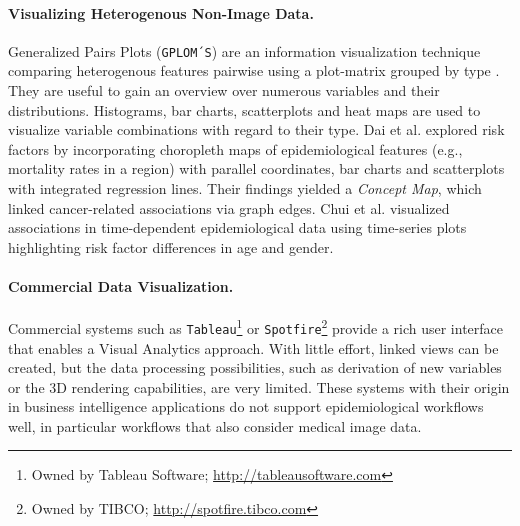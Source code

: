 \documentclass[journal]{style/vgtc} 			          %
\begin{document}
\paragraph{Visualizing Heterogenous Non-Image Data.}
Generalized Pairs Plots (\texttt{GPLOM´S}) are an information visualization technique comparing heterogenous features pairwise using a plot-matrix grouped by type \cite{GPLOMS, Francois2013}.
%
They are useful to gain an overview over numerous variables and their distributions.
%
Histograms, bar charts, scatterplots and heat maps are used to visualize variable combinations with regard to their type.
%
%
%
%
Dai et al. \cite{Dai2005} explored risk factors by incorporating choropleth maps of epidemiological features (e.g., mortality rates in a region) with parallel coordinates, bar charts and scatterplots with integrated regression lines.
%
Their findings yielded a \emph{Concept Map}, which linked cancer-related associations via graph edges.
%
Chui et al. \cite{Chui2011} visualized associations in time-dependent epidemiological data using time-series plots highlighting risk factor differences in age and gender.

\paragraph{Commercial Data Visualization.}
Commercial systems such as \texttt{Tableau}\footnote{Owned by Tableau Software; \url{http://tableausoftware.com}} or \texttt{Spotfire}\footnote{Owned by TIBCO; \url{http://spotfire.tibco.com}} provide a rich user interface that enables a Visual Analytics approach.
%
With little effort, linked views can be created, but the data processing possibilities, such as derivation of new variables or the 3D rendering capabilities, are very limited.
%
These systems with their origin in business intelligence applications do not support epidemiological workflows well, in particular workflows that also consider medical image data.
\end{document}
